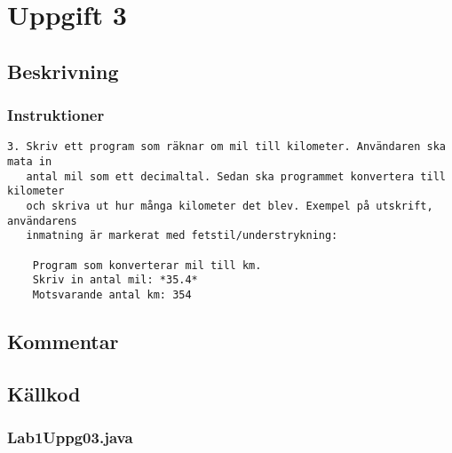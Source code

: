 \section{Uppgift 3}\label{uppgift-3}

\subsection{Beskrivning}
\subsubsection*{Instruktioner}
\begin{verbatim}
3. Skriv ett program som räknar om mil till kilometer. Användaren ska mata in
   antal mil som ett decimaltal. Sedan ska programmet konvertera till kilometer
   och skriva ut hur många kilometer det blev. Exempel på utskrift, användarens
   inmatning är markerat med fetstil/understrykning:

    Program som konverterar mil till km.
    Skriv in antal mil: *35.4*
    Motsvarande antal km: 354
\end{verbatim}

\subsection{Kommentar}

\subsection{Källkod}\label{uppgift-3_src}
\subsubsection*{Lab1Uppg03.java}
\inputminted[]{java}{src/Lab1Uppg03.java}
